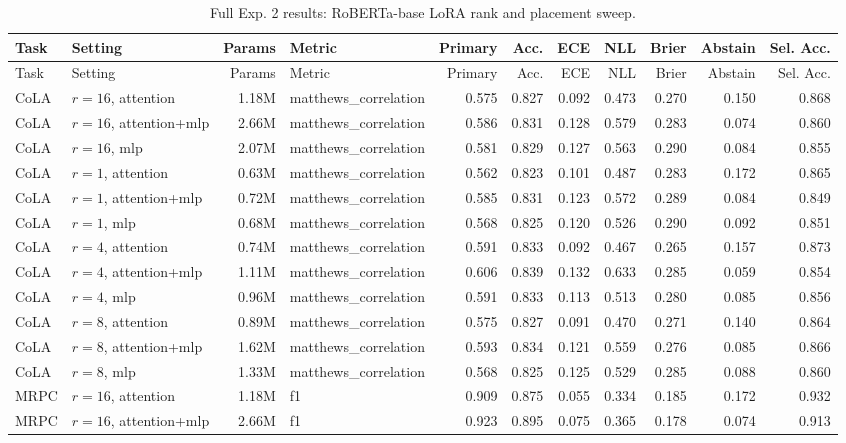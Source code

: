 {\scriptsize
\begin{longtable}{llrlrrrrrrr}
\caption{Full Exp. 2 results: RoBERTa-base LoRA rank and placement sweep.}
\label{tab:exp2-full}\\
\toprule
Task & Setting & Params & Metric & Primary & Acc. & ECE & NLL & Brier & Abstain & Sel. Acc. \\
\midrule
\endfirsthead
\toprule
Task & Setting & Params & Metric & Primary & Acc. & ECE & NLL & Brier & Abstain & Sel. Acc. \\
\midrule
\endhead
CoLA & $r=16$, attention & 1.18M & matthews\_correlation & 0.575 & 0.827 & 0.092 & 0.473 & 0.270 & 0.150 & 0.868 \\
CoLA & $r=16$, attention+mlp & 2.66M & matthews\_correlation & 0.586 & 0.831 & 0.128 & 0.579 & 0.283 & 0.074 & 0.860 \\
CoLA & $r=16$, mlp & 2.07M & matthews\_correlation & 0.581 & 0.829 & 0.127 & 0.563 & 0.290 & 0.084 & 0.855 \\
CoLA & $r=1$, attention & 0.63M & matthews\_correlation & 0.562 & 0.823 & 0.101 & 0.487 & 0.283 & 0.172 & 0.865 \\
CoLA & $r=1$, attention+mlp & 0.72M & matthews\_correlation & 0.585 & 0.831 & 0.123 & 0.572 & 0.289 & 0.084 & 0.849 \\
CoLA & $r=1$, mlp & 0.68M & matthews\_correlation & 0.568 & 0.825 & 0.120 & 0.526 & 0.290 & 0.092 & 0.851 \\
CoLA & $r=4$, attention & 0.74M & matthews\_correlation & 0.591 & 0.833 & 0.092 & 0.467 & 0.265 & 0.157 & 0.873 \\
CoLA & $r=4$, attention+mlp & 1.11M & matthews\_correlation & 0.606 & 0.839 & 0.132 & 0.633 & 0.285 & 0.059 & 0.854 \\
CoLA & $r=4$, mlp & 0.96M & matthews\_correlation & 0.591 & 0.833 & 0.113 & 0.513 & 0.280 & 0.085 & 0.856 \\
CoLA & $r=8$, attention & 0.89M & matthews\_correlation & 0.575 & 0.827 & 0.091 & 0.470 & 0.271 & 0.140 & 0.864 \\
CoLA & $r=8$, attention+mlp & 1.62M & matthews\_correlation & 0.593 & 0.834 & 0.121 & 0.559 & 0.276 & 0.085 & 0.866 \\
CoLA & $r=8$, mlp & 1.33M & matthews\_correlation & 0.568 & 0.825 & 0.125 & 0.529 & 0.285 & 0.088 & 0.860 \\
MRPC & $r=16$, attention & 1.18M & f1 & 0.909 & 0.875 & 0.055 & 0.334 & 0.185 & 0.172 & 0.932 \\
MRPC & $r=16$, attention+mlp & 2.66M & f1 & 0.923 & 0.895 & 0.075 & 0.365 & 0.178 & 0.074 & 0.913 \\

\end{longtable}}
